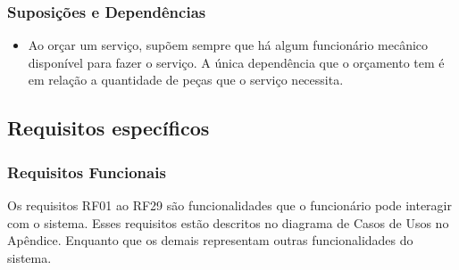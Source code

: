 	\subsubsection{Suposições e Dependências}
		\begin{itemize}
			\item Ao orçar um serviço, supõem sempre que há algum funcionário mecânico disponível para fazer o serviço. A única dependência que o orçamento tem é em relação a quantidade de peças que o serviço necessita.		
		\end{itemize}
	
	
\subsection{Requisitos específicos}

\subsubsection{Requisitos Funcionais}

\par
Os requisitos RF01 ao RF29 são funcionalidades que o funcionário pode interagir com o sistema. Esses requisitos estão descritos no diagrama de Casos de Usos no Apêndice. Enquanto que os demais representam outras funcionalidades do sistema.

